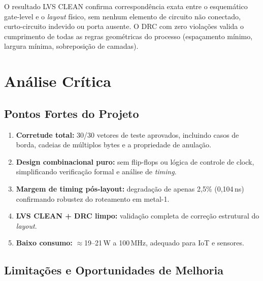 \documentclass[12pt,a4paper]{article}
\begin{document}
O resultado LVS CLEAN confirma correspondência exata entre o esquemático gate-level e o \textit{layout} físico, sem nenhum elemento de circuito não conectado, curto-circuito indevido ou porta ausente. O DRC com zero violações valida o cumprimento de todas as regras geométricas do processo (espaçamento mínimo, largura mínima, sobreposição de camadas).

\section{Análise Crítica}

\subsection{Pontos Fortes do Projeto}

\begin{enumerate}[leftmargin=2em,label=\textbf{\arabic*.}]
  \item \textbf{Corretude total:} 30/30 vetores de teste aprovados, incluindo casos de borda, cadeias de múltiplos bytes e a propriedade de anulação.
  \item \textbf{Design combinacional puro:} sem flip-flops ou lógica de controle de clock, simplificando verificação formal e análise de \textit{timing}.
  \item \textbf{Margem de timing pós-layout:} degradação de apenas 2,5\% (0,104\,ns) confirmando robustez do roteamento em metal-1.
  \item \textbf{LVS CLEAN + DRC limpo:} validação completa de correção estrutural do \textit{layout}.
  \item \textbf{Baixo consumo:} $\approx$19--21\,\textmu W a 100\,MHz, adequado para IoT e sensores.
\end{enumerate}

\subsection{Limitações e Oportunidades de Melhoria}
\end{document}
